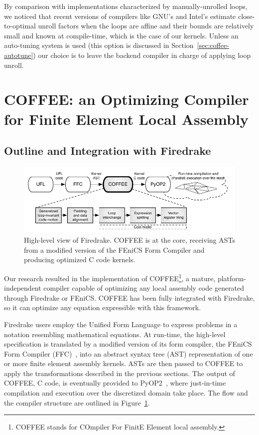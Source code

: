 By comparison with implementations characterized by manually-unrolled loops, we noticed that recent versions of compilers like GNU's and Intel's estimate close-to-optimal unroll factors when the loops are affine and their bounds are relatively small and known at compile-time, which is the case of our kernels. Unless an auto-tuning system is used (this option is discussed in Section~\ref{sec:coffee-autotune}) our choice is to leave the backend compiler in charge of applying loop unroll. 


\section{COFFEE: an Optimizing Compiler for Finite Element Local Assembly}
\label{sec:coffee-implementation}
\subsection{Outline and Integration with Firedrake}

\begin{figure}
\begin{center}
\includegraphics[scale=0.70]{coffee/pictures/coffee-pipeline.pdf}
\caption{High-level view of Firedrake. COFFEE is at the core, receiving ASTs from a modified version of the FEniCS Form Compiler and producing optimized C code kernels.}
\label{fig:coffee-pipeline}
\end{center}
\end{figure}

Our research resulted in the implementation of COFFEE\footnote{COFFEE stands for COmpiler For FinitE Element local assembly.}, a mature, platform-independent compiler capable of optimizing any local assembly code generated through Firedrake or FEniCS. COFFEE has been fully integrated with Firedrake, so it can optimize any equation expressible with this framework.

Firedrake users employ the Unified Form Language to express problems in a notation resembling mathematical equations. At run-time, the high-level specification is translated by a modified version of its form compiler, the FEniCS Form Compiler (FFC)~\cite{FFC-Compiler}, into an abstract syntax tree (AST) representation of one or more finite element assembly kernels. ASTs are then passed to COFFEE to apply the transformations described in the previous sections. The output of COFFEE, C code, is eventually provided to PyOP2~\citep{pyop2isc}, where just-in-time compilation and execution over the discretized domain take place. The flow and the compiler structure are outlined in Figure~\ref{fig:coffee-pipeline}. 

